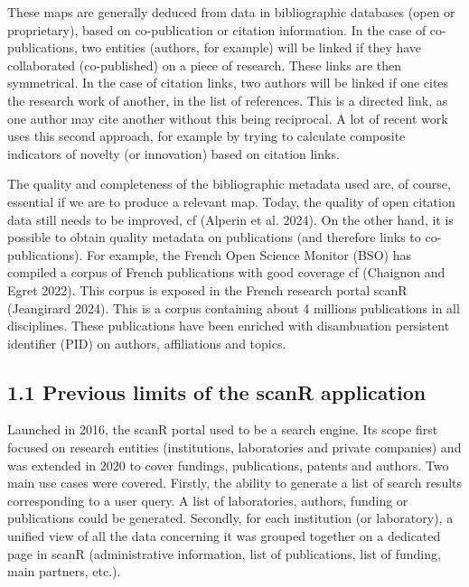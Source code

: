 \documentclass[
]{article}
\begin{document}
These maps are generally deduced from data in bibliographic databases
(open or proprietary), based on co-publication or citation information.
In the case of co-publications, two entities (authors, for example) will
be linked if they have collaborated (co-published) on a piece of
research. These links are then symmetrical. In the case of citation
links, two authors will be linked if one cites the research work of
another, in the list of references. This is a directed link, as one
author may cite another without this being reciprocal. A lot of recent
work uses this second approach, for example by trying to calculate
composite indicators of novelty (or innovation) based on citation links.

The quality and completeness of the bibliographic metadata used are, of
course, essential if we are to produce a relevant map. Today, the
quality of open citation data still needs to be improved, cf (Alperin et
al. 2024). On the other hand, it is possible to obtain quality metadata
on publications (and therefore links to co-publications). For example,
the French Open Science Monitor (BSO) has compiled a corpus of French
publications with good coverage cf (Chaignon and Egret 2022). This
corpus is exposed in the French research portal scanR (Jeangirard 2024).
This is a corpus containing about 4 millions publications in all
disciplines. These publications have been enriched with disambuation
persistent identifier (PID) on authors, affiliations and topics.

\hypertarget{previous-limits-of-the-scanr-application}{%
\subsection{1.1 Previous limits of the scanR
application}\label{previous-limits-of-the-scanr-application}}

Launched in 2016, the scanR portal used to be a search engine. Its scope
first focused on research entities (institutions, laboratories and
private companies) and was extended in 2020 to cover fundings,
publications, patents and authors. Two main use cases were covered.
Firstly, the ability to generate a list of search results corresponding
to a user query. A list of laboratories, authors, funding or
publications could be generated. Secondly, for each institution (or
laboratory), a unified view of all the data concerning it was grouped
together on a dedicated page in scanR (administrative information, list
of publications, list of funding, main partners, etc.).
\end{document}
